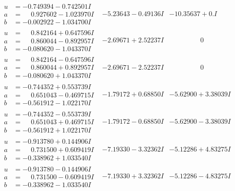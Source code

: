 \documentclass[1p]{elsarticle_modified}
\theoremstyle{definition}
\begin{document}
$$\begin{array}{c|c|c}
\begin{aligned}
u &= -0.749394 - 0.742501 I \\
a &= \phantom{-}0.927602 - 1.023970 I \\
b &= -0.002922 - 1.034700 I\end{aligned}
 & -5.23643 - 0.49136 I & -10.35637 + 0. I\phantom{ +0.000000I} \\ \hline\begin{aligned}
u &= \phantom{-}0.842164 + 0.647596 I \\
a &= \phantom{-}0.860044 - 0.892957 I \\
b &= -0.080620 - 1.043370 I\end{aligned}
 & -2.69671 + 2.52237 I & \phantom{-0.000000 } 0 \\ \hline\begin{aligned}
u &= \phantom{-}0.842164 - 0.647596 I \\
a &= \phantom{-}0.860044 + 0.892957 I \\
b &= -0.080620 + 1.043370 I\end{aligned}
 & -2.69671 - 2.52237 I & \phantom{-0.000000 } 0 \\ \hline\begin{aligned}
u &= -0.744352 + 0.553739 I \\
a &= \phantom{-}0.651043 - 0.469715 I \\
b &= -0.561912 - 1.022170 I\end{aligned}
 & -1.79172 + 0.68850 I & -5.62900 + 3.38039 I \\ \hline\begin{aligned}
u &= -0.744352 - 0.553739 I \\
a &= \phantom{-}0.651043 + 0.469715 I \\
b &= -0.561912 + 1.022170 I\end{aligned}
 & -1.79172 - 0.68850 I & -5.62900 - 3.38039 I \\ \hline\begin{aligned}
u &= -0.913780 + 0.144906 I \\
a &= \phantom{-}0.731500 + 0.609419 I \\
b &= -0.338962 + 1.033540 I\end{aligned}
 & -7.19330 - 3.32362 I & -5.12286 + 4.83275 I \\ \hline\begin{aligned}
u &= -0.913780 - 0.144906 I \\
a &= \phantom{-}0.731500 - 0.609419 I \\
b &= -0.338962 - 1.033540 I\end{aligned}
 & -7.19330 + 3.32362 I & -5.12286 - 4.83275 I \\ \hline\begin{aligned}

\end{aligned}
\end{array}$$
\end{document}
